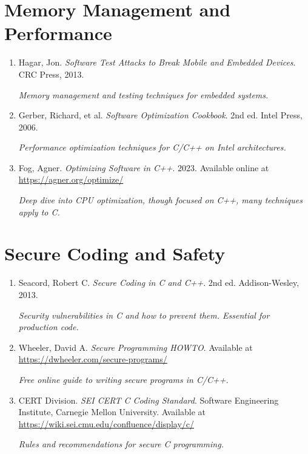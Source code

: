 \documentclass[11pt,openany]{book}
\begin{document}
\section*{Memory Management and Performance}

\begin{enumerate}
    \item Hagar, Jon. \textit{Software Test Attacks to Break Mobile and Embedded Devices}. CRC Press, 2013.

    \textit{Memory management and testing techniques for embedded systems.}

    \item Gerber, Richard, et al. \textit{Software Optimization Cookbook}. 2nd ed. Intel Press, 2006.

    \textit{Performance optimization techniques for C/C++ on Intel architectures.}

    \item Fog, Agner. \textit{Optimizing Software in C++}. 2023. Available online at \url{https://agner.org/optimize/}

    \textit{Deep dive into CPU optimization, though focused on C++, many techniques apply to C.}
\end{enumerate}

\section*{Secure Coding and Safety}

\begin{enumerate}
    \item Seacord, Robert C. \textit{Secure Coding in C and C++}. 2nd ed. Addison-Wesley, 2013.

    \textit{Security vulnerabilities in C and how to prevent them. Essential for production code.}

    \item Wheeler, David A. \textit{Secure Programming HOWTO}. Available at \url{https://dwheeler.com/secure-programs/}

    \textit{Free online guide to writing secure programs in C/C++.}

    \item CERT Division. \textit{SEI CERT C Coding Standard}. Software Engineering Institute, Carnegie Mellon University. Available at \url{https://wiki.sei.cmu.edu/confluence/display/c/}

    \textit{Rules and recommendations for secure C programming.}
\end{enumerate}
\end{document}
